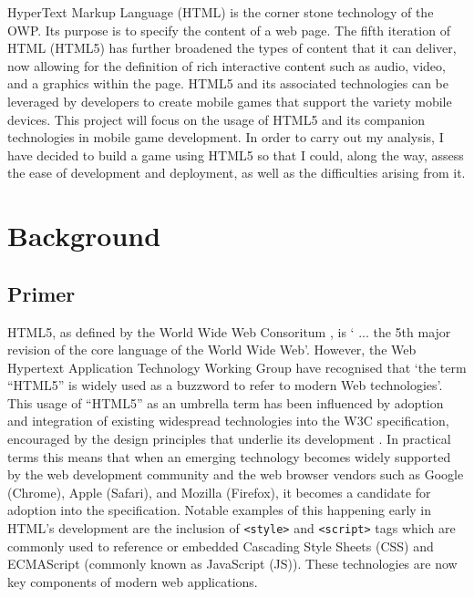 \documentclass[final]{cmpreport}
\begin{document}
HyperText Markup Language (HTML) is the corner stone technology of the OWP. Its purpose is to specify the content of a web page. The fifth iteration of HTML (HTML5) has further broadened the types of content that it can deliver, now allowing for the definition of rich interactive content such as audio, video, and a graphics within the page. HTML5 and its associated technologies can be leveraged by developers to create mobile games that support the variety mobile devices. This project will focus on the usage of HTML5 and its companion technologies in mobile game development. In order to carry out my analysis, I have decided to build a game using HTML5 so that I could, along the way, assess the ease of development and deployment, as well as the difficulties arising from it.

\section{Background}

\subsection{Primer}

HTML5, as defined by the World Wide Web Consoritum \citep{W3C2}, is ` ... the 5th major revision of the core language of the World Wide Web'. However, the Web Hypertext Application Technology Working Group \citep{WHATWG} have recognised that `the term ``HTML5'' is widely used as a buzzword to refer to modern Web technologies'. This usage of ``HTML5'' as an umbrella term has been influenced by adoption and integration of existing widespread technologies into the W3C specification, encouraged by the design principles that underlie its development \citep{Keith}. In practical terms this means that when an emerging technology becomes widely supported by the web development community and the web browser vendors such as Google (Chrome), Apple (Safari), and Mozilla (Firefox), it becomes a candidate for adoption into the specification. Notable examples of this happening early in HTML's development are the inclusion of \texttt{<style>} and \texttt{<script>} tags which are commonly used to reference or embedded Cascading Style Sheets (CSS) and ECMAScript (commonly known as JavaScript (JS)). These technologies are now key components of modern web applications.\footnotemark

\end{document}
